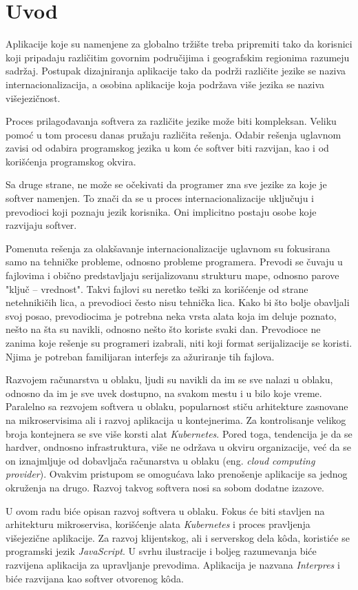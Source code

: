 \chapter{Uvod}\label{ch:uvod}

Aplikacije koje su namenjene za globalno tržište treba pripremiti 
tako da korisnici koji pripadaju različitim govornim područijima i 
geografskim regionima razumeju sadržaj. Postupak dizajniranja aplikacije 
tako da podrži različite jezike se naziva internacionalizacija, a osobina 
aplikacije koja podržava više jezika se naziva višejezičnost. 

Proces prilagođavanja softvera za različite jezike može biti kompleksan. 
Veliku pomoć u tom procesu danas pružaju različita rešenja. Odabir rešenja 
uglavnom zavisi od odabira programskog jezika u kom će softver biti 
razvijan, kao i od korišćenja programskog okvira.

Sa druge strane, ne može se očekivati da programer zna sve jezike za koje je 
softver namenjen. To znači da se u proces internacionalizacije uključuju i 
prevodioci koji poznaju jezik korisnika. Oni implicitno 
postaju osobe koje razvijaju softver.

Pomenuta rešenja za olakšavanje internacionalizacije uglavnom su fokusirana
samo na tehničke probleme, odnosno probleme programera. Prevodi se čuvaju u
fajlovima i obično predstavljaju serijalizovanu strukturu mape, odnosno parove
"ključ -- vrednost". Takvi fajlovi su neretko teški za korišćenje od strane
netehnikičih lica, a prevodioci često nisu tehnička lica. Kako bi što bolje 
obavljali svoj posao, prevodiocima je potrebna neka vrsta alata koja im deluje
poznato, nešto na šta su navikli, odnosno nešto što koriste svaki dan. 
Prevodioce ne zanima koje rešenje su programeri izabrali, niti koji format 
serijalizacije se koristi. Njima je potreban familijaran interfejs za ažuriranje
tih fajlova.

Razvojem računarstva u oblaku, ljudi su navikli da im se sve nalazi u oblaku, 
odnosno da im je sve uvek dostupno, na svakom mestu i u bilo koje vreme. 
Paralelno sa rezvojem softvera u oblaku, popularnost stiču arhitekture zasnovane
na mikroservisima ali i razvoj aplikacija u kontejnerima. Za kontrolisanje 
velikog broja kontejnera se sve više korsti alat \textit{Kubernetes}. Pored toga, 
tendencija je da se hardver, ondnosno infrastruktura, više ne održava u okviru
organizacije, već da se on iznajmljuje od dobavljača računarstva u oblaku 
(eng. \textit{cloud computing provider}). Ovakvim pristupom se omogućava lako 
prenošenje aplikacije sa jednog okruženja na drugo. Razvoj takvog softvera nosi
sa sobom dodatne izazove. 

U ovom radu biće opisan razvoj softvera u oblaku. Fokus će biti stavljen na 
arhitekturu mikroservisa, korišćenje alata \textit{Kubernetes} i proces pravljenja 
višejezične aplikacije. Za razvoj klijentskog, ali i serverskog dela 
kôda, koristiće se programski jezik \textit{JavaScript}. U svrhu ilustracije i
boljeg razumevanja biće razvijena aplikacija za upravljanje prevodima. 
Aplikacija je nazvana \textit{Interpres} i biće razvijana kao softver otvorenog kôda.
